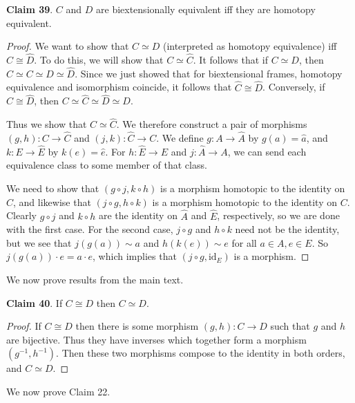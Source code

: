 \documentclass{article}
\begin{document}
\bigskip
\noindent \textbf{Claim 39}.
$C$ and $D$ are biextensionally equivalent iff they are homotopy equivalent.

\begin{proof}
We want to show that $C \simeq D$ (interpreted as homotopy equivalence) iff $\hat{C} \cong \hat{D}$.
To do this, we will show that $C \simeq \hat{C}$.
It follows that if $C \simeq D$, then $\hat{C} \simeq C \simeq D \simeq \hat{D}$.
Since we just showed that for biextensional frames, homotopy equivalence and isomorphism coincide, it follows that $\hat{C} \cong \hat{D}$.
Conversely, if $\hat{C} \cong \hat{D}$, then $C \simeq \hat{C} \simeq \hat{D} \simeq D$.

Thus we show that $C \simeq \hat{C}$.
We therefore construct a pair of morphisms $(g, h) : C \to \hat{C}$ and $(j, k) : \hat{C} \to C$.
We define $g : A \to \hat{A}$ by $g(a) = \hat{a}$, and $k : E \to \hat{E}$ by $k(e) = \hat{e}$.
For $h : \hat{E} \to E$ and $j : \hat{A} \to A$, we can send each equivalence class to some member of that class.

We need to show that $(g \circ j, k \circ h)$ is a morphism homotopic to the identity on $\hat{C}$, and likewise that $(j \circ g, h \circ k)$ is a morphism homotopic to the identity on $C$.
Clearly $g \circ j$ and $k \circ h$ are the identity on $\hat{A}$ and $\hat{E}$, respectively, so we are done with the first case.
For the second case, $j \circ g$ and $h \circ k$ need not be the identity, but we see that $j(g(a)) \sim a$ and $h(k(e)) \sim e$ for all $a \in A, e \in E$.
So $j(g(a)) \cdot e = a \cdot e$, which implies that $(j \circ g, \text{id}_E)$ is a morphism.
\end{proof}
\bigskip
\noindent We now prove results from the main text.

\bigskip
\noindent \textbf{Claim 40}.
If $C \cong D$ then $C \simeq D$.

\begin{proof}
If $C \cong D$ then there is some morphism $(g, h) : C \to D$ such that $g$ and $h$ are bijective.
Thus they have inverses which together form a morphism $(g^{-1}, h^{-1})$.
Then these two morphisms compose to the identity in both orders, and $C \simeq D$.
\end{proof}
We now prove Claim 22.
\end{document}
